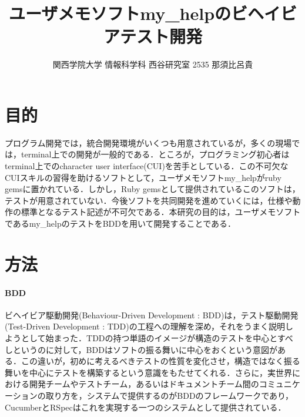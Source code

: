 \documentclass[10pt,a4j,twocolumn]{jsarticle}
\begin{document}
\title{ユーザメモソフトmy\_helpのビヘイビアテスト開発}
\author{関西学院大学 情報科学科 西谷研究室 2535 那須比呂貴}
\date{}
\maketitle

\section{目的}
\vspace{-0.5em}
プログラム開発では，統合開発環境がいくつも用意されているが，多くの現場では，terminal上での開発が一般的である．ところが，プログラミング初心者はterminal上でのcharacter user interface(CUI)を苦手としている．この不可欠なCUIスキルの習得を助けるソフトとして，ユーザメモソフトmy\_helpがruby gemsに置かれている．しかし，Ruby gemsとして提供されているこのソフトは，テストが用意されていない．今後ソフトを共同開発を進めていくには，仕様や動作の標準となるテスト記述が不可欠である．本研究の目的は，ユーザメモソフトであるmy\_helpのテストをBDDを用いて開発することである．

\section{方法}
\vspace{-0.5em}
\paragraph{BDD}
ビヘイビア駆動開発(Behaviour-Driven Development : BDD)は，テスト駆動開発(Test-Driven Development : TDD)の工程への理解を深め，それをうまく説明しようとして始まった．TDDの持つ単語のイメージが構造のテストを中心とすべしというのに対して，BDDはソフトの振る舞いに中心をおくという意図がある．この違いが，初めに考えるべきテストの性質を変化させ，構造ではなく振る舞いを中心にテストを構築するという意識をもたせてくれる．さらに，実世界における開発チームやテストチーム，あるいはドキュメントチーム間のコミュニケーションの取り方を，システムで提供するのがBDDのフレームワークであり，CucumberとRSpecはこれを実現する一つのシステムとして提供されている\cite{RSpecBook}．
\end{document}
